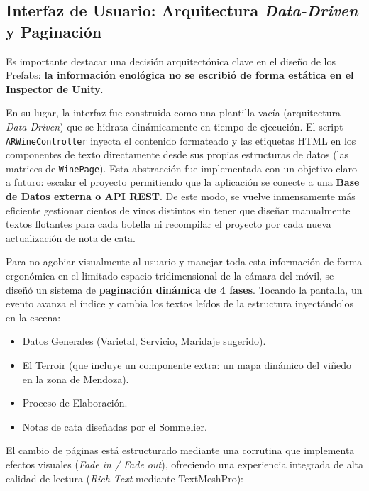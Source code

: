 \documentclass[11pt,a4paper]{article}
\begin{document}
\subsection{Interfaz de Usuario: Arquitectura \textit{Data-Driven} y Paginación}
Es importante destacar una decisión arquitectónica clave en el diseño de los Prefabs: \textbf{la información enológica no se escribió de forma estática en el Inspector de Unity}. 

En su lugar, la interfaz fue construida como una plantilla vacía (arquitectura \textit{Data-Driven}) que se hidrata dinámicamente en tiempo de ejecución. El script \texttt{ARWineController} inyecta el contenido formateado y las etiquetas HTML en los componentes de texto directamente desde sus propias estructuras de datos (las matrices de \texttt{WinePage}). 
Esta abstracción fue implementada con un objetivo claro a futuro: escalar el proyecto permitiendo que la aplicación se conecte a una \textbf{Base de Datos externa o API REST}. De este modo, se vuelve inmensamente más eficiente gestionar cientos de vinos distintos sin tener que diseñar manualmente textos flotantes para cada botella ni recompilar el proyecto por cada nueva actualización de nota de cata.

Para no agobiar visualmente al usuario y manejar toda esta información de forma ergonómica en el limitado espacio tridimensional de la cámara del móvil, se diseñó un sistema de \textbf{paginación dinámica de 4 fases}.
Tocando la pantalla, un evento avanza el índice y cambia los textos leídos de la estructura inyectándolos en la escena:
\begin{itemize}
    \item Datos Generales (Varietal, Servicio, Maridaje sugerido).
    \item El Terroir (que incluye un componente extra: un mapa dinámico del viñedo en la zona de Mendoza).
    \item Proceso de Elaboración.
    \item Notas de cata diseñadas por el Sommelier.
\end{itemize}

El cambio de páginas está estructurado mediante una corrutina que implementa efectos visuales (\textit{Fade in / Fade out}), ofreciendo una experiencia integrada de alta calidad de lectura (\textit{Rich Text} mediante TextMeshPro):
\end{document}
